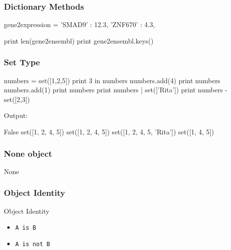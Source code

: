 \begin{frame}[fragile]
\frametitle{Dictionary Methods}

\begin{python}
gene2expression = {
    'SMAD9' : 12.3,
    'ZNF670' : 4.3,
}
    
print len(gene2ensembl)
print gene2ensembl.keys()
\end{python}


\end{frame}

\begin{frame}[fragile]
\frametitle{Set Type}
\begin{python}
numbers = set([1,2,5])
print 3 in numbers
numbers.add(4)
print numbers
numbers.add(1)
print numbers
print numbers | set(['Rita'])
print numbers - set([2,3])
\end{python}

Output:
\begin{python}
False
set([1, 2, 4, 5])
set([1, 2, 4, 5])
set([1, 2, 4, 5, 'Rita'])
set([1, 4, 5])
\end{python}

\end{frame}

\begin{frame}[fragile]
\frametitle{None object}

\begin{python}
None
\end{python}
\end{frame}

\begin{frame}[fragile]
\frametitle{Object Identity}

\begin{block}{Object Identity}
\begin{itemize}
\item \lstinline{A is B}
\item \lstinline{A is not B}
\end{itemize}
\end{block}

\end{frame}

